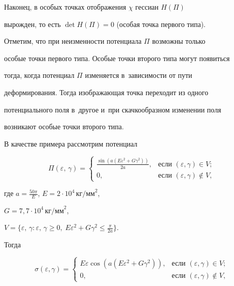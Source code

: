 Наконец, в особых точках отображения $\chi$ гессиан $H(\Pi)$

вырожден, то есть $\det H(\Pi)=0$ (особая точка первого типа).

Отметим, что при неизменности потенциала $\Pi$ возможны только

особые точки первого типа. Особые точки второго типа могут появиться

тогда, когда потенциал $\Pi$ изменяется в~зависимости от пути

деформирования. Тогда изображающая точка переходит из одного

потенциального поля в~другое и~при скачкообразном изменении поля

возникают особые точки второго типа.



В качестве примера рассмотрим потенциал

$$

\Pi(\varepsilon,\,\gamma) = \left\{

\begin{array}{ll}

\displaystyle\frac{\sin(a(E\varepsilon^2+G\gamma^2))}{2a}, & \textrm{если } (\varepsilon,\gamma) \in V ;\\

0, & \textrm{если } (\varepsilon,\gamma) \notin V{,}

\end{array} \right.

$$

где $a=\frac{50\pi}{E}$, $E=2\cdot10^4 \,\mbox{кг/мм}^2$,

$G=7{,}7\cdot10^4 \,\mbox{кг/мм}^2$,

$V=\{\varepsilon,\,\gamma: \varepsilon,\,\gamma\geq0,\;E\varepsilon^2+G\gamma^2\leqslant\frac{\pi}{2a}\}.$



        Тогда

\begin{equation}

\label{my:eq7} \sigma(\varepsilon,\gamma) = \left\{

\begin{array}{ll}

E\varepsilon \cos(a(E\varepsilon^2+G\gamma^2)), & \textrm{если } (\varepsilon,\gamma) \in V  ;\\

0, & \textrm{если } (\varepsilon,\gamma) \notin V,

\end{array} \right.

\end{equation}

